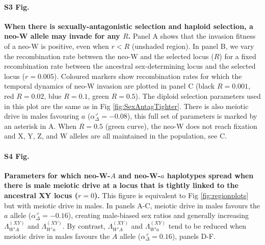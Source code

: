 \documentclass[10pt,letterpaper]{article}
\begin{document}
\paragraph*{S3 Fig.}
\label{fig:SexAntagTighterMaleDrive}
{\bf  When there is sexually-antagonistic selection and haploid selection, a neo-W allele may invade for any $R$.}
Panel A shows that the invasion fitness of a neo-W is positive, even when $r<R$ (unshaded region).
In panel B, we vary the recombination rate between the neo-W and the selected locus ($R$) for a fixed recombination rate between the ancestral sex-determining locus and the selected locus ($r=0.005$).
Coloured markers show recombination rates for which the temporal dynamics of neo-W invasion are plotted in panel C (black $R=0.001$, red $R=0.02$, blue $R=0.1$, green $R=0.5$). 
The diploid selection parameters used in this plot are the same as in Fig \ref{fig:SexAntagTighter}. 
There is also meiotic drive in males favouring $a$ ($\alpha_{\Delta}^\male=-0.08$), this full set of parameters is marked by an asterisk in A.
When $R=0.5$ (green curve), the neo-W does not reach fixation and X, Y, Z, and W alleles are all maintained in the population, see C.

\paragraph*{S4 Fig.}
\label{fig:regionMaleDrive}
{\bf Parameters for which neo-W-$A$ and neo-W-$a$ haplotypes spread when there is male meiotic drive at a locus that is tightly linked to the ancestral XY locus ($r=0$).}
This figure is equivalent to Fig \ref{fig:regionplots} but with meiotic drive in males.
In panels A-C, meiotic drive in males favours the $a$ allele ($\alpha_{\Delta}^\male=-0.16$), creating male-biased sex ratios and generally increasing $\Lambda_{W'A}^{(XY)}$ and $\Lambda_{W'a}^{(XY)}$. 
By contrast, $\Lambda_{W'A}^{(XY)}$ and $\Lambda_{W'a}^{(XY)}$ tend to be reduced when meiotic drive in males favours the $A$ allele ($\alpha_{\Delta}^\male=0.16$), panels D-F. 
\end{document}
